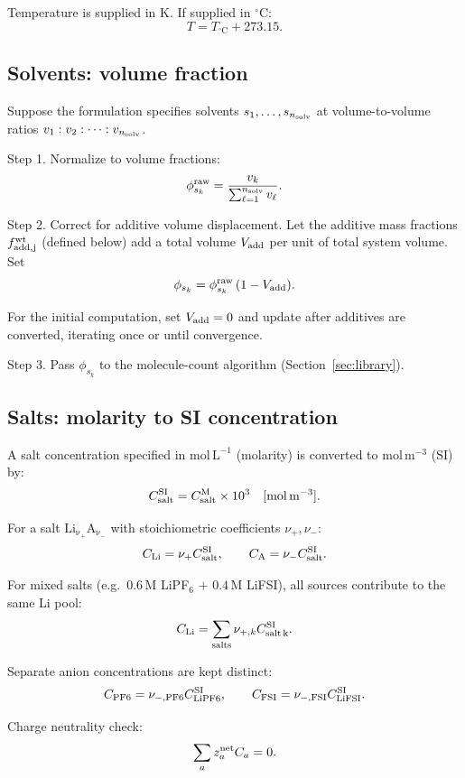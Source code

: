 \documentclass[11pt]{article}
\begin{document}
Temperature is supplied in \(\mathrm K\). If supplied in \({}^\circ\mathrm C\):
\[
T = T_{{}^\circ\mathrm C} + 273.15.
\]

\subsection{Solvents: volume fraction}

Suppose the formulation specifies solvents \(s_1,\ldots,s_{n_{\rm solv}}\) at
volume-to-volume ratios \(v_1:v_2:\cdots:v_{n_{\rm solv}}\).

Step 1. Normalize to volume fractions:
\[
\phi_{s_k}^{\rm raw}
=
\frac{v_k}{\sum_{\ell=1}^{n_{\rm solv}} v_\ell}.
\]

Step 2. Correct for additive volume displacement. Let the additive mass
fractions \(f_{\rm add,j}^{\rm wt}\) (defined below) add a total volume
\(V_{\rm add}\) per unit of total system volume. Set
\[
\phi_{s_k}
=
\phi_{s_k}^{\rm raw}\,(1-V_{\rm add}).
\]

For the initial computation, set \(V_{\rm add}=0\) and update after additives
are converted, iterating once or until convergence.

Step 3. Pass \(\phi_{s_k}\) to the molecule-count algorithm
(Section~\ref{sec:library}).

\subsection{Salts: molarity to SI concentration}

A salt concentration specified in \(\mathrm{mol\,L^{-1}}\) (molarity) is
converted to \(\mathrm{mol\,m^{-3}}\) (SI) by:
\[
C_{\rm salt}^{\rm SI}
=
C_{\rm salt}^{\rm M} \times 10^3
\quad [\mathrm{mol\,m^{-3}}].
\]

For a salt \(\mathrm{Li_{\nu_+}A_{\nu_-}}\) with stoichiometric coefficients
\(\nu_+,\nu_-\):
\[
C_{\rm Li} = \nu_+ C_{\rm salt}^{\rm SI},
\qquad
C_{\rm A} = \nu_- C_{\rm salt}^{\rm SI}.
\]

For mixed salts (e.g.\ \(0.6\,\mathrm{M}\) LiPF$_6$ \(+\) \(0.4\,\mathrm{M}\)
LiFSI), all sources contribute to the same Li pool:
\[
C_{\rm Li}
=
\sum_{\rm salts} \nu_{+,k} C_{\rm salt\,k}^{\rm SI}.
\]

Separate anion concentrations are kept distinct:
\[
C_{\rm PF6} = \nu_{-,\rm PF6} C_{\rm LiPF6}^{\rm SI},
\qquad
C_{\rm FSI} = \nu_{-,\rm FSI} C_{\rm LiFSI}^{\rm SI}.
\]

Charge neutrality check:
\[
\sum_a z_a^{\rm net} C_a = 0.
\]
\end{document}
